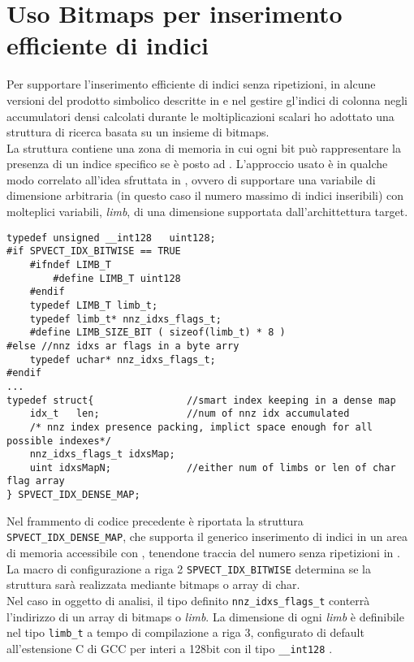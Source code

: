 \section{Uso Bitmaps per inserimento efficiente di indici} \label{chSpMMAux:bitmapInsert}
Per supportare l'inserimento efficiente di indici senza ripetizioni,
in alcune versioni del prodotto simbolico descritte in  e nel gestire gl'indici di colonna 
negli accumulatori densi calcolati durante le moltiplicazioni scalari ho adottato
una struttura di ricerca basata su un insieme di bitmaps.\\
La struttura contiene una zona di memoria in cui ogni bit può rappresentare la presenza di un indice specifico
se è posto ad .
\voidLine
L'approccio usato è in qualche modo correlato all'idea sfruttata in \cite{GMP},
ovvero di supportare una variabile di dimensione arbitraria (in questo caso il numero massimo di indici inseribili)
con molteplici variabili, \emph{limb}, di una dimensione supportata dall'archittettura target.\\
\begin{lstlisting}
typedef unsigned __int128	uint128;
#if SPVECT_IDX_BITWISE == TRUE
	#ifndef LIMB_T
		#define LIMB_T uint128
	#endif
	typedef LIMB_T limb_t;
	typedef limb_t* nnz_idxs_flags_t;
	#define LIMB_SIZE_BIT ( sizeof(limb_t) * 8 )
#else //nnz idxs ar flags in a byte arry
	typedef uchar* nnz_idxs_flags_t;
#endif
...
typedef struct{                //smart index keeping in a dense map
	idx_t	len;               //num of nnz idx accumulated
	/* nnz index presence packing, implict space enough for all possible indexes*/
	nnz_idxs_flags_t idxsMap;
	uint idxsMapN;             //either num of limbs or len of char flag array
} SPVECT_IDX_DENSE_MAP;
\end{lstlisting}
Nel frammento di codice precedente è riportata la struttura \verb|SPVECT_IDX_DENSE_MAP|, che supporta
il generico inserimento di indici in un area di memoria accessibile con , 
tenendone traccia del numero senza ripetizioni in .\\
La macro di configurazione a riga 2 \verb|SPVECT_IDX_BITWISE| determina se la struttura sarà realizzata
mediante bitmaps o array di char.\\
Nel caso in oggetto di analisi, il tipo definito \verb|nnz_idxs_flags_t| conterrà l'indirizzo
di un array di bitmaps o \emph{limb}.
\voidLine
La dimensione di ogni \emph{limb} è definibile nel tipo \verb|limb_t| a tempo di compilazione a riga 3, 
configurato di default all'estensione C di GCC per interi a 128bit con il tipo \verb|__int128| \cite{gcc10.1}.\\
